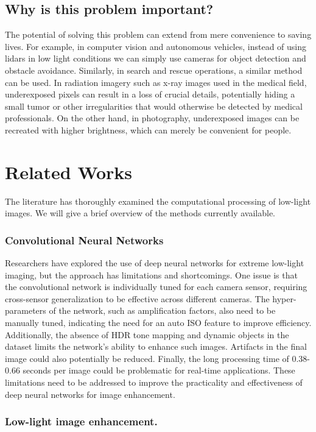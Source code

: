\documentclass{article}
\begin{document}
\subsection{Why is this problem important?}
The potential of solving this problem can extend from mere convenience to saving lives. For example, in computer vision and autonomous vehicles, instead of using lidars in low light conditions we can simply use cameras for object detection and obstacle avoidance. Similarly, in search and rescue operations, a similar method can be used. In radiation imagery such as x-ray images used in the medical field, underexposed pixels can result in a loss of crucial details, potentially hiding a small tumor or other irregularities that would otherwise be detected by medical professionals. On the other hand, in photography, underexposed images can be recreated with higher brightness, which can merely be convenient for people.
\section{Related Works}

The literature has thoroughly examined the computational processing of low-light images. We will give a brief overview of the methods currently available.

\subsubsection{Convolutional Neural Networks} 
Researchers have explored the use of deep neural networks for extreme low-light imaging, but the approach has limitations and shortcomings. One issue is that the convolutional network\cite{LearningToSeeInTheDark} is individually tuned for each camera sensor, requiring cross-sensor generalization to be effective across different cameras. The hyper-parameters of the network, such as amplification factors, also need to be manually tuned, indicating the need for an auto ISO feature to improve efficiency. Additionally, the absence of HDR tone mapping and dynamic objects in the dataset limits the network's ability to enhance such images. Artifacts in the final image could also potentially be reduced. Finally, the long processing time of 0.38-0.66 seconds per image could be problematic for real-time applications. These limitations need to be addressed to improve the practicality and effectiveness of deep neural networks for image enhancement.

\subsubsection{Low-light image enhancement.}
\end{document}
